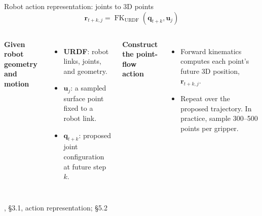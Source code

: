 \documentclass[aspectratio=169,12pt]{beamer}
\newcommand{\credit}[1]{\par\hfill{\tiny\color{mute}\citet{huang2026pointworld}, #1}\par}
\newcommand{\pw}[1]{{\color{pw}#1}}
\begin{document}
\begin{frame}{Robot action representation: joints to 3D points}
  \vspace{-5pt}
  \[
    \mathbf r_{t+k,j}
    =
    \operatorname{FK}_{\mathrm{URDF}}
    (\mathbf q_{t+k},\mathbf u_j)
  \]

  \begin{columns}[T,onlytextwidth]
    {\small\bfseries\color{pw}Given robot geometry and motion}\par
    \vspace{6pt}
    \footnotesize
    \begin{itemize}\setlength{\itemsep}{9pt}
      \item<1-> \textbf{URDF}: robot links, joints, and geometry.
      \item<2-> $\mathbf u_j$: a sampled surface point fixed to a robot link.
      \item<3-> $\mathbf q_{t+k}$: proposed joint configuration at future step $k$.
    \end{itemize}

    {\small\bfseries\color{pw}Construct the point-flow action}\par
    \vspace{6pt}
    \footnotesize
    \begin{itemize}\setlength{\itemsep}{10pt}
      \item<4-> Forward kinematics computes each point's future 3D position,
        $\mathbf r_{t+k,j}$.
      \item<4-> Repeat over the proposed trajectory.
        In practice, sample \pw{300--500 points per gripper}.
    \end{itemize}
  \end{columns}
  \vfill
  \credit{\S3.1, action representation; \S5.2}
\end{frame}
\end{document}
